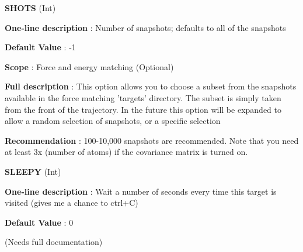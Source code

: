 \begin{DoxyItemize}
\item {\bfseries  S\-H\-O\-T\-S } (Int) \par
{\bfseries  One-\/line description }\-: Number of snapshots; defaults to all of the snapshots \par
{\bfseries  Default Value }\-: -\/1 \par
{\bfseries  Scope }\-: Force and energy matching (Optional) \par
{\bfseries  Full description }\-: This option allows you to choose a subset from the snapshots available in the force matching 'targets' directory. The subset is simply taken from the front of the trajectory. In the future this option will be expanded to allow a random selection of snapshots, or a specific selection \par
{\bfseries  Recommendation }\-: 100-\/10,000 snapshots are recommended. Note that you need at least 3x (number of atoms) if the covariance matrix is turned on.\end{DoxyItemize}
\begin{DoxyItemize}
\item {\bfseries  S\-L\-E\-E\-P\-Y } (Int) \par
{\bfseries  One-\/line description }\-: Wait a number of seconds every time this target is visited (gives me a chance to ctrl+\-C) \par
{\bfseries  Default Value }\-: 0 \par
(Needs full documentation)\end{DoxyItemize}
